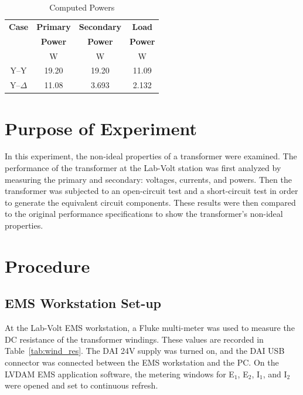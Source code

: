 \documentclass{article}
\begin{document}
\begin{table}[H]
  \centering
  \begin{tabular}{*{4}{c}}
    \textbf{Case} & \textbf{Primary} & \textbf{Secondary} & \textbf{Load} \\

    & \textbf{Power} & \textbf{Power} & \textbf{Power} \\

    & W & W & W \\
    \hline

    Y--Y        & 19.20 & 19.20 & 11.09 \\
    Y--$\Delta$ & 11.08 & 3.693 & 2.132 \\
  \end{tabular}
  \caption{Computed Powers}
  \label{tab:pow_comp}
\end{table}

\section{Purpose of Experiment}

In this experiment, the non-ideal properties of a transformer were examined.
The performance of the transformer at the Lab-Volt station was first analyzed
by measuring the primary and secondary: voltages, currents, and powers. Then
the transformer was subjected to an open-circuit test and a short-circuit test
in order to generate the equivalent circuit components. These results were then
compared to the original performance specifications to show the transformer's
non-ideal properties.

\section{Procedure}

\subsection{EMS Workstation Set-up}

At the Lab-Volt EMS workstation, a Fluke multi-meter was used to measure the DC
resistance of the transformer windings. These values are recorded in
Table~\ref{tab:wind_res}.  The DAI 24V supply was turned on, and the DAI USB
connector was connected between the EMS workstation and the {PC}. On the LVDAM
EMS application software, the metering windows for E$_1$, E$_2$, I$_1$, and
I$_2$ were opened and set to continuous refresh.
\end{document}
